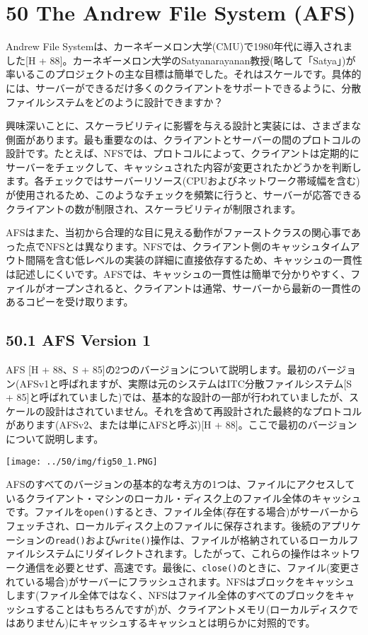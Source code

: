 \newpage

\hypertarget{the-andrew-file-system-afs}{%
\section*{50 The Andrew File System
(AFS)}\label{the-andrew-file-system-afs}}

Andrew File
Systemは、カーネギーメロン大学(CMU)で1980年代に導入されました{[}H +
88{]}。カーネギーメロン大学のSatyanarayanan教授(略して「Satya」)が率いるこのプロジェクトの主な目標は簡単でした。それはスケールです。具体的には、サーバーができるだけ多くのクライアントをサポートできるように、分散ファイルシステムをどのように設計できますか？

興味深いことに、スケーラビリティに影響を与える設計と実装には、さまざまな側面があります。最も重要なのは、クライアントとサーバーの間のプロトコルの設計です。たとえば、NFSでは、プロトコルによって、クライアントは定期的にサーバーをチェックして、キャッシュされた内容が変更されたかどうかを判断します。各チェックではサーバーリソース(CPUおよびネットワーク帯域幅を含む)が使用されるため、このようなチェックを頻繁に行うと、サーバーが応答できるクライアントの数が制限され、スケーラビリティが制限されます。

AFSはまた、当初から合理的な目に見える動作がファーストクラスの関心事であった点でNFSとは異なります。NFSでは、クライアント側のキャッシュタイムアウト間隔を含む低レベルの実装の詳細に直接依存するため、キャッシュの一貫性は記述しにくいです。AFSでは、キャッシュの一貫性は簡単で分かりやすく、ファイルがオープンされると、クライアントは通常、サーバーから最新の一貫性のあるコピーを受け取ります。

\hypertarget{afs-version-1}{%
\subsection*{50.1 AFS Version 1}\label{afs-version-1}}

AFS {[}H + 88、S +
85{]}の2つのバージョンについて説明します。最初のバージョン(AFSv1と呼ばれますが、実際は元のシステムはITC分散ファイルシステム{[}S
+
85{]}と呼ばれていました)では、基本的な設計の一部が行われていましたが、スケールの設計はされていません。それを含めて再設計された最終的なプロトコルがあります(AFSv2、または単にAFSと呼ぶ){[}H
+ 88{]}。ここで最初のバージョンについて説明します。

\texttt{[image: ../50/img/fig50\_1.PNG]}

AFSのすべてのバージョンの基本的な考え方の1つは、ファイルにアクセスしているクライアント・マシンのローカル・ディスク上のファイル全体のキャッシュです。ファイルを\texttt{open()}するとき、ファイル全体(存在する場合)がサーバーからフェッチされ、ローカルディスク上のファイルに保存されます。後続のアプリケーションの\texttt{read()}および\texttt{write()}操作は、ファイルが格納されているローカルファイルシステムにリダイレクトされます。したがって、これらの操作はネットワーク通信を必要とせず、高速です。最後に、\texttt{close()}のときに、ファイル(変更されている場合)がサーバーにフラッシュされます。NFSはブロックをキャッシュします(ファイル全体ではなく、NFSはファイル全体のすべてのブロックをキャッシュすることはもちろんですが)が、クライアントメモリ(ローカルディスクではありません)にキャッシュするキャッシュとは明らかに対照的です。

